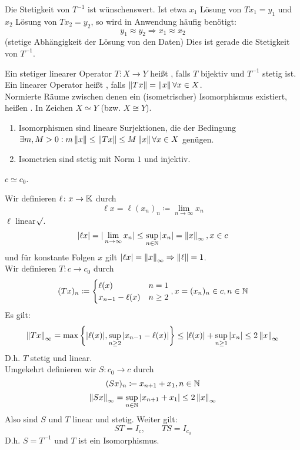 \begin{bemerkung*}
	Die Stetigkeit von $ T^{-1} $ ist w\"unschenswert. Ist etwa $ x_1 $ L\"osung von $ Tx_1=y_1 $ und $ x_2 $ L\"osung von $ Tx_2=y_2 $, so wird in Anwendung h\"aufig ben\"otigt:
	\[ y_1\approx y_2\Rightarrow x_1\approx x_2 \]
	(stetige Abh\"angigkeit der L\"osung von den Daten) Dies ist gerade die Stetigkeit von $ T^{-1} $.
\end{bemerkung*}
\begin{definition}
	Ein stetiger linearer Operator $ T\colon X\rightarrow Y $ hei\ss t , falls $ T $ bijektiv und $ T^{-1} $ stetig ist.\\
	Ein linearer Operator hei\ss t , falls $ \left\|Tx\right\|=\left\|x\right\|\forall x\in X $.\\
	Normierte R\"aume zwischen denen ein (isometrischer) Isomorphismus existiert, hei\ss en . In Zeichen $ X\simeq Y $ (bzw. $ X\cong Y $).
\end{definition}
\begin{bemerkung*}
	\begin{enumerate}
		\item 	Isomorphismen sind lineare Surjektionen, die der Bedingung $ \exists m,M>0: m\left\|x\right\|\leq\left\|Tx\right\|\leq M\left\|x\right\|\forall x\in X $ gen\"ugen.
		\item Isometrien sind stetig mit Norm $ 1 $ und injektiv.
	\end{enumerate}
\end{bemerkung*}
\begin{satz}
	$ c\simeq c_0 $.
\end{satz}
\begin{beweis}
	Wir definieren $ \ell\colon x\rightarrow \mathbb{K} $ durch
	\[ \ell x=\ell(x_n)_n\coloneqq\lim_{n\to\infty}x_n \]
	$ \ell $ linear$ \surd $.
	\[ |\ell x|=|\lim_{n\to\infty} x_n|\leq\sup_{n\in\mathbb{N}}|x_n|=\left\|x\right\|_\infty, x\in c \]
	und f\"ur konstante Folgen $ x $ gilt $ |\ell x|=\left\|x\right\|_\infty \Rightarrow\left\|\ell\right\|=1$.\\
	Wir definieren $ T\colon c\rightarrow c_0 $ durch
	\[ (Tx)_n\coloneqq \begin{cases}
	\ell(x)&n=1\\x_{n-1}-\ell(x)&n\geq 2
	\end{cases}, x=(x_n)_n\in c,n\in\mathbb{N} \]
	Es gilt:
	\[ \left\|Tx\right\|_\infty=\max\left\lbrace|\ell(x)|,\sup_{n\geq 2}|x_{n-1}-\ell(x)|\right\rbrace\leq|\ell(x)|+\sup_{n\geq 1}|x_n|\leq 2\left\|x\right\|_\infty \]
	D.h. $ T $ stetig und linear.\\
	Umgekehrt definieren wir $ S\colon c_0\rightarrow c $ durch
	\[ (Sx)_n\coloneqq x_{n+1}+x_1, n\in\mathbb{N} \]
	\[ \left\|Sx\right\|_\infty=\sup_{n\in\mathbb{N}}|x_{n+1}+x_1|\leq 2\left\|x\right\|_\infty \]
	Also sind $ S $ und $ T $ linear und stetig. Weiter gilt:
	\[ ST=I_c,\qquad TS=I_{c_0} \]
	D.h. $ S=T^{-1} $ und $ T $ ist ein Isomorphismus.
\end{beweis}
